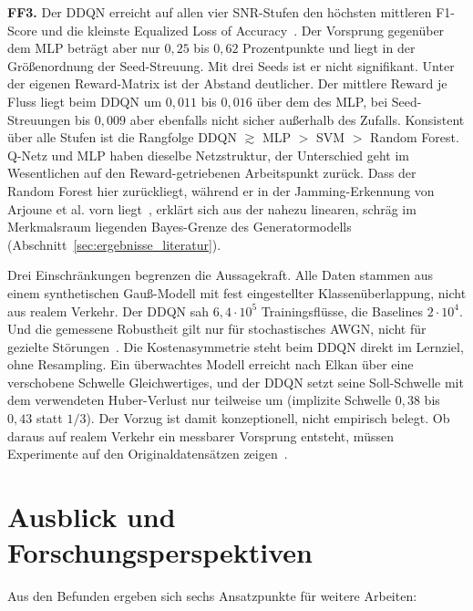 \textbf{FF3.} Der DDQN erreicht auf allen vier SNR-Stufen den höchsten mittleren F1-Score und die kleinste Equalized Loss of Accuracy~\autocite{saezEvaluatingClassifierBehavior2016}. Der Vorsprung gegenüber dem MLP beträgt aber nur $0{,}25$ bis $0{,}62$ Prozentpunkte und liegt in der Größenordnung der Seed-Streuung. Mit drei Seeds ist er nicht signifikant. Unter der eigenen Reward-Matrix ist der Abstand deutlicher. Der mittlere Reward je Fluss liegt beim DDQN um $0{,}011$ bis $0{,}016$ über dem des MLP, bei Seed-Streuungen bis $0{,}009$ aber ebenfalls nicht sicher außerhalb des Zufalls. Konsistent über alle Stufen ist die Rangfolge DDQN $\gtrsim$ MLP $>$ SVM $>$ Random Forest. Q-Netz und MLP haben dieselbe Netzstruktur, der Unterschied geht im Wesentlichen auf den Reward-getriebenen Arbeitspunkt zurück. Dass der Random Forest hier zurückliegt, während er in der Jamming-Erkennung von Arjoune et al. vorn liegt~\autocite{arjouneNovelJammingAttacks2020}, erklärt sich aus der nahezu linearen, schräg im Merkmalsraum liegenden Bayes-Grenze des Generatormodells (Abschnitt~\ref{sec:ergebnisse_literatur}).

Drei Einschränkungen begrenzen die Aussagekraft. Alle Daten stammen aus einem synthetischen Gauß-Modell mit fest eingestellter Klassenüberlappung, nicht aus realem Verkehr. Der DDQN sah $6{,}4\cdot10^{5}$ Trainingsflüsse, die Baselines $2\cdot10^{4}$. Und die gemessene Robustheit gilt nur für stochastisches AWGN, nicht für gezielte Störungen~\autocite{merzoukEvadingDeepReinforcement2022}. Die Kostenasymmetrie steht beim DDQN direkt im Lernziel, ohne Resampling. Ein überwachtes Modell erreicht nach Elkan über eine verschobene Schwelle Gleichwertiges, und der DDQN setzt seine Soll-Schwelle mit dem verwendeten Huber-Verlust nur teilweise um (implizite Schwelle $0{,}38$ bis $0{,}43$ statt $1/3$). Der Vorzug ist damit konzeptionell, nicht empirisch belegt. Ob daraus auf realem Verkehr ein messbarer Vorsprung entsteht, müssen Experimente auf den Originaldatensätzen zeigen~\autocite{balaAITechniquesIoTbased2024, kumarComprehensiveReviewVulnerabilities2024}.

\section{Ausblick und Forschungsperspektiven}
\label{sec:fazit_ausblick}

Aus den Befunden ergeben sich sechs Ansatzpunkte für weitere Arbeiten:

